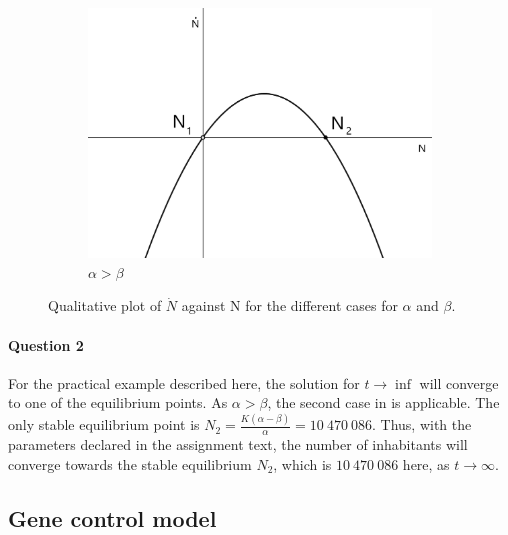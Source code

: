 \documentclass[a4paper,11pt]{article}
\begin{document}
\begin{figure}[H]
{\begin{subfigure}{0.45\linewidth}
		\includegraphics[width=\textwidth]{agtb.png}
		\caption{$\alpha>\beta$}
	\end{subfigure}
	}
	\caption{Qualitative plot of $\dot{N}$ against N for the different cases for $\alpha$ and $\beta$.}
	\label{fig:trbif}
\end{figure}
\paragraph{Question 2}\: For the practical example described here, the solution for $t\rightarrow\inf$ will converge to one 
of the equilibrium points. As $\alpha>\beta$, the second case in  is applicable. The only stable equilibrium point
is $N_2=\frac{K(\alpha-\beta)}{\alpha}=10\:470\:086$. Thus, with the parameters declared in the assignment text,
the number of inhabitants will converge towards the stable equilibrium $N_2$, which is $10\:470\:086$ here, as 
$t\rightarrow\infty$.\\

\subsection{Gene control model}
\end{document}

